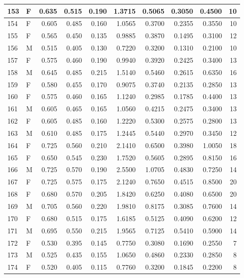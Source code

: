 \documentclass[9pt,twocolumn,twoside,]{pnas-new}
\begin{document}
\begin{tabular}{l|l|r|r|r|r|r|r|r|r}
\hline
153 & F & 0.635 & 0.515 & 0.190 & 1.3715 & 0.5065 & 0.3050 & 0.4500 & 10\\
\hline
154 & F & 0.605 & 0.485 & 0.160 & 1.0565 & 0.3700 & 0.2355 & 0.3550 & 10\\
\hline
155 & F & 0.565 & 0.450 & 0.135 & 0.9885 & 0.3870 & 0.1495 & 0.3100 & 12\\
\hline
156 & M & 0.515 & 0.405 & 0.130 & 0.7220 & 0.3200 & 0.1310 & 0.2100 & 10\\
\hline
157 & F & 0.575 & 0.460 & 0.190 & 0.9940 & 0.3920 & 0.2425 & 0.3400 & 13\\
\hline
158 & M & 0.645 & 0.485 & 0.215 & 1.5140 & 0.5460 & 0.2615 & 0.6350 & 16\\
\hline
159 & F & 0.580 & 0.455 & 0.170 & 0.9075 & 0.3740 & 0.2135 & 0.2850 & 13\\
\hline
160 & F & 0.575 & 0.460 & 0.165 & 1.1240 & 0.2985 & 0.1785 & 0.4400 & 13\\
\hline
161 & M & 0.605 & 0.465 & 0.165 & 1.0560 & 0.4215 & 0.2475 & 0.3400 & 13\\
\hline
162 & F & 0.605 & 0.485 & 0.160 & 1.2220 & 0.5300 & 0.2575 & 0.2800 & 13\\
\hline
163 & M & 0.610 & 0.485 & 0.175 & 1.2445 & 0.5440 & 0.2970 & 0.3450 & 12\\
\hline
164 & F & 0.725 & 0.560 & 0.210 & 2.1410 & 0.6500 & 0.3980 & 1.0050 & 18\\
\hline
165 & F & 0.650 & 0.545 & 0.230 & 1.7520 & 0.5605 & 0.2895 & 0.8150 & 16\\
\hline
166 & M & 0.725 & 0.570 & 0.190 & 2.5500 & 1.0705 & 0.4830 & 0.7250 & 14\\
\hline
167 & F & 0.725 & 0.575 & 0.175 & 2.1240 & 0.7650 & 0.4515 & 0.8500 & 20\\
\hline
168 & F & 0.680 & 0.570 & 0.205 & 1.8420 & 0.6250 & 0.4080 & 0.6500 & 20\\
\hline
169 & M & 0.705 & 0.560 & 0.220 & 1.9810 & 0.8175 & 0.3085 & 0.7600 & 14\\
\hline
170 & F & 0.680 & 0.515 & 0.175 & 1.6185 & 0.5125 & 0.4090 & 0.6200 & 12\\
\hline
171 & M & 0.695 & 0.550 & 0.215 & 1.9565 & 0.7125 & 0.5410 & 0.5900 & 14\\
\hline
172 & F & 0.530 & 0.395 & 0.145 & 0.7750 & 0.3080 & 0.1690 & 0.2550 & 7\\
\hline
173 & M & 0.525 & 0.435 & 0.155 & 1.0650 & 0.4860 & 0.2330 & 0.2850 & 8\\
\hline
174 & F & 0.520 & 0.405 & 0.115 & 0.7760 & 0.3200 & 0.1845 & 0.2200 & 8\\

\end{tabular}
\end{document}
